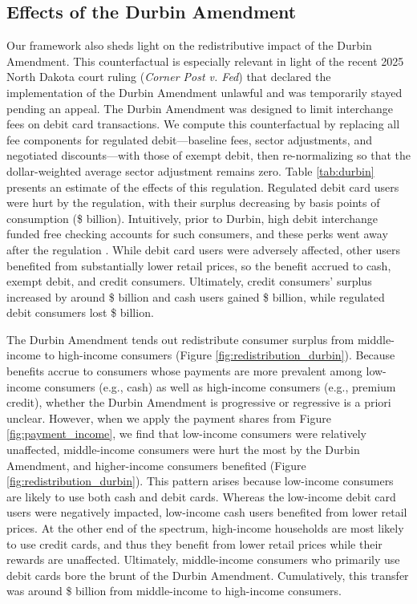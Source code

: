 \documentclass[main.tex]{subfiles}
\begin{document}
\subsection{Effects of the Durbin Amendment}

Our framework also sheds light on the redistributive impact of the Durbin Amendment.
This counterfactual is especially relevant in light of the recent 2025 North Dakota court ruling (\textit{Corner Post v. Fed}) that declared the implementation of the Durbin Amendment unlawful and was temporarily stayed pending an appeal.
The Durbin Amendment was designed to limit interchange fees on debit card transactions.
We compute this counterfactual by replacing all fee components for regulated debit---baseline fees, sector adjustments, and negotiated discounts---with those of exempt debit, then re-normalizing so that the dollar-weighted average sector adjustment remains zero.
Table \ref{tab:durbin} presents an estimate of the effects of this regulation.
Regulated debit card users were hurt by the regulation, with their surplus decreasing by  basis points of consumption (\$ billion).
Intuitively, prior to Durbin, high debit interchange funded free checking accounts for such consumers, and these perks went away after the regulation \citep{Mukharlyamov.Sarin2025}.
While debit card users were adversely affected, other users benefited from substantially lower retail prices, so the benefit accrued to cash, exempt debit, and credit consumers.
Ultimately, credit consumers' surplus increased by around \$ billion and cash users gained \$ billion, while regulated debit consumers lost \$ billion.

The Durbin Amendment tends out redistribute consumer surplus from middle-income to high-income consumers (Figure \ref{fig:redistribution_durbin}).
Because benefits accrue to consumers whose payments are more prevalent among low-income consumers (e.g., cash) as well as high-income consumers (e.g., premium credit), whether the Durbin Amendment is progressive or regressive is a priori unclear.
However, when we apply the payment shares from Figure \ref{fig:payment_income}, we find that low-income consumers were relatively unaffected, middle-income consumers were hurt the most by the Durbin Amendment, and higher-income consumers benefited (Figure \ref{fig:redistribution_durbin}).
This pattern arises because low-income consumers are likely to use both cash and debit cards.
Whereas the low-income debit card users were negatively impacted, low-income cash users benefited from lower retail prices.
At the other end of the spectrum, high-income households are most likely to use credit cards, and thus they benefit from lower retail prices while their rewards are unaffected.
Ultimately, middle-income consumers who primarily use debit cards bore the brunt of the Durbin Amendment.
Cumulatively, this transfer was around \$ billion from middle-income to high-income consumers.
\end{document}
